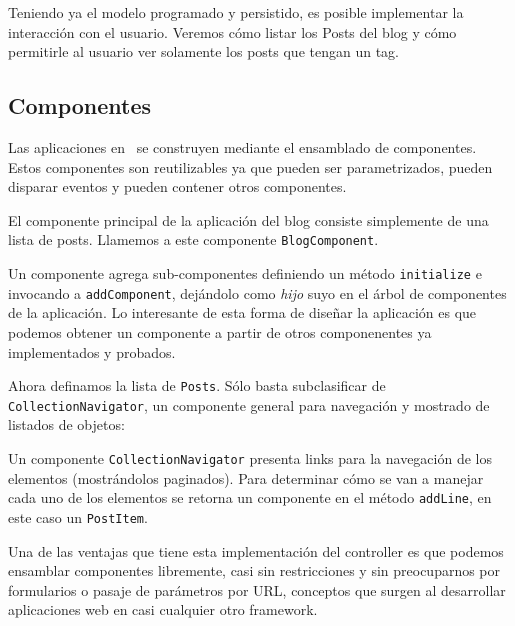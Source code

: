 Teniendo ya el modelo programado y persistido, es posible implementar la interacción con el usuario. Veremos cómo listar los Posts del blog y cómo permitirle al usuario ver solamente los posts que tengan un tag.

\subsection{Componentes}
\label{sub-comp}

Las aplicaciones en \PWB\ se construyen mediante el ensamblado de componentes. Estos componentes son reutilizables ya que pueden ser parametrizados, pueden disparar eventos y pueden contener otros componentes.

El componente principal de la aplicación del blog consiste simplemente de una lista de posts. Llamemos a este componente \verb"BlogComponent".


Un componente agrega sub-componentes definiendo un método \verb"initialize" e invocando a \verb"addComponent", dejándolo como \emph{hijo} suyo en el árbol de componentes de la aplicación. Lo interesante de esta forma de diseñar la aplicación es que podemos obtener un componente a partir de otros componenentes ya implementados y probados.


Ahora definamos la lista de \verb"Posts". Sólo basta subclasificar de \verb"CollectionNavigator", un componente general para navegación y mostrado de listados de objetos:


Un componente \verb"CollectionNavigator" presenta links para la navegación de los elementos (mostrándolos paginados). Para determinar cómo se van a manejar cada uno de los elementos se retorna un componente en el método \verb"addLine", en este caso un \verb'PostItem'.

Una de las ventajas que tiene esta implementación del controller es que podemos ensamblar componentes libremente, casi sin restricciones y sin preocuparnos por formularios o pasaje de parámetros por URL, conceptos que surgen al desarrollar aplicaciones web en casi cualquier otro framework.

